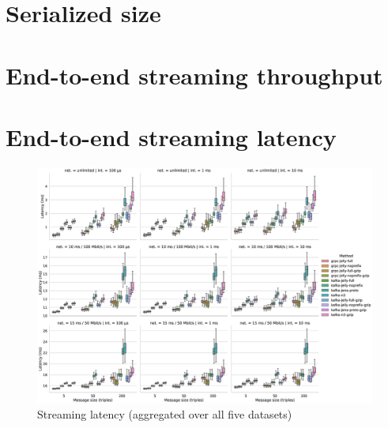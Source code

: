 \documentclass{article}
\begin{document}
\clearpage

\section{Serialized size}



\clearpage

\section{End-to-end streaming throughput}




\clearpage

\section{End-to-end streaming latency}

\begin{figure}[h!]
    \centering
    \includegraphics[width=24cm]{img/latency_all.eps}
    \caption{Streaming latency (aggregated over all five datasets)}
\end{figure}
\end{document}
